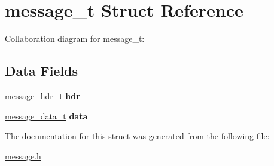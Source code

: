 \hypertarget{structmessage__t}{}\section{message\+\_\+t Struct Reference}
\label{structmessage__t}


Collaboration diagram for message\+\_\+t\+:
\subsection*{Data Fields}
\begin{DoxyCompactItemize}
\item 
\mbox{\label{structmessage__t_ad467c1444d361c52dd802f5609aa9f4c}} 
\hyperlink{structmessage__hdr__t}{message\+\_\+hdr\+\_\+t} {\bfseries hdr}
\item 
\mbox{\label{structmessage__t_a4e61df2d2b915250fd442d19a80ca4ca}} 
\hyperlink{structmessage__data__t}{message\+\_\+data\+\_\+t} {\bfseries data}
\end{DoxyCompactItemize}


The documentation for this struct was generated from the following file\+:\begin{DoxyCompactItemize}
\item 
\hyperlink{message_8h}{message.\+h}\end{DoxyCompactItemize}
